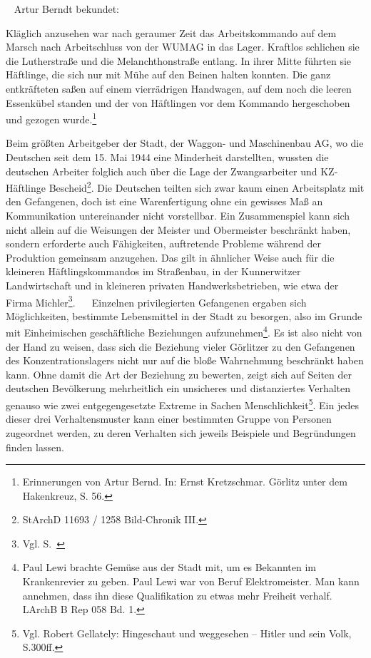 ~\newline
Artur Berndt bekundet:
\begin{leftbar}
Kläglich anzusehen war nach geraumer Zeit das Arbeitskommando auf dem Marsch nach Arbeitschluss von der WUMAG in das Lager. Kraftlos schlichen sie die Lutherstraße und die Melanchthonstraße entlang. In ihrer Mitte führten sie Häftlinge, die sich nur mit Mühe auf den Beinen halten konnten. Die ganz entkräfteten saßen auf einem vierrädrigen Handwagen, auf dem noch die leeren Essenkübel standen und der von Häftlingen vor dem Kommando hergeschoben und gezogen wurde.\footnote{Erinnerungen von Artur Bernd. In: Ernst Kretzschmar. Görlitz unter dem Hakenkreuz, S. 56.}
\end{leftbar}
Beim größten Arbeitgeber der Stadt, der Waggon- und Maschinenbau AG, wo die Deutschen seit dem 15. Mai 1944 eine Minderheit darstellten, wussten die deutschen Arbeiter folglich auch über die Lage der Zwangsarbeiter und KZ-Häftlinge Bescheid\footnote{StArchD 11693 / 1258 Bild-Chronik III.}. Die Deutschen teilten sich zwar kaum einen Arbeitsplatz mit den Gefangenen, doch ist eine Warenfertigung ohne ein gewisses Maß an Kommunikation untereinander nicht vorstellbar. Ein Zusammenspiel kann sich nicht allein auf die Weisungen der Meister und Obermeister beschränkt haben, sondern erforderte auch Fähigkeiten, auftretende Probleme während der Produktion gemeinsam anzugehen. Das gilt in ähnlicher Weise auch für die kleineren Häftlingskommandos im Straßenbau, in der Kunnerwitzer Landwirtschaft und in kleineren privaten Handwerksbetrieben, wie etwa der Firma Michler\footnote{Vgl. S.~\pageref{michel}}.
~\newline~
Einzelnen privilegierten Gefangenen ergaben sich Möglichkeiten, bestimmte Lebensmittel in der Stadt zu besorgen, also im Grunde mit Einheimischen geschäftliche Beziehungen aufzunehmen\footnote{Paul Lewi brachte Gemüse aus der Stadt mit, um es Bekannten im Krankenrevier zu geben. Paul Lewi war von Beruf Elektromeister. Man kann annehmen, dass ihn diese Qualifikation zu etwas mehr Freiheit verhalf. LArchB B Rep 058 Bd. 1.}.
\newline
Es ist also nicht von der Hand zu weisen, dass sich die Beziehung vieler Görlitzer zu den Gefangenen des Konzentrationslagers nicht nur auf die bloße Wahrnehmung beschränkt haben kann. Ohne damit die Art der Beziehung zu bewerten, zeigt sich auf Seiten der deutschen Bevölkerung mehrheitlich ein unsicheres und distanziertes Verhalten genauso wie zwei entgegengesetzte Extreme in Sachen Menschlichkeit\footnote{Vgl. Robert Gellately: Hingeschaut und weggesehen -- Hitler und sein Volk, S.300ff.}.
Ein jedes dieser drei Verhaltensmuster kann einer bestimmten Gruppe von Personen zugeordnet werden, zu deren Verhalten sich jeweils Beispiele und Begründungen finden lassen.

